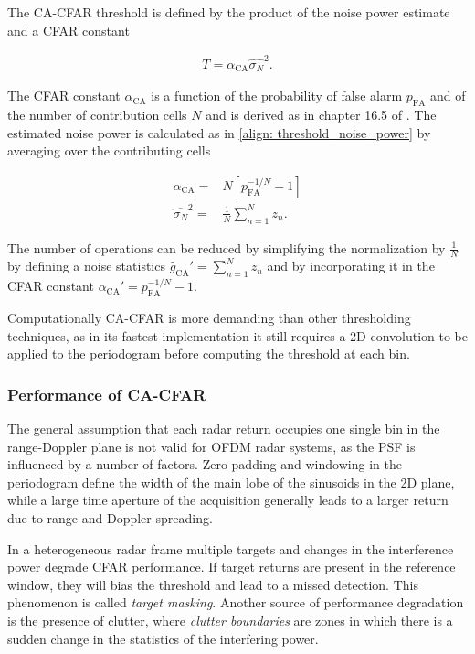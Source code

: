 
The CA-CFAR threshold is defined by the product of the noise power estimate and a CFAR constant

\begin{align*}
	T = \alpha_{\text{CA}} \hat{\sigma_N}^2.
\end{align*}

The CFAR constant $\alpha_{\text{CA}}$ is a function of the probability of false alarm $p_{\text{FA}}$ and of the number of contribution cells $N$ and is derived as in chapter 16.5 of \cite{Richards_Scheer_Holm_2010}. The estimated noise power is calculated as in \ref{align: threshold_noise_power} by averaging over the contributing cells

\begin{align*}
	\alpha_{\text{CA}} =& N[p_{\text{FA}}^{-1/N} - 1] \\
	\hat{\sigma_N}^2 =& \frac{1}{N}\sum_{n=1}^N z_n.
\end{align*}

The number of operations can be reduced by simplifying the normalization by $\frac{1}{N}$ by defining a noise statistics $\hat{g}_{\text{CA}}' = \sum_{n=1}^N z_n$ and by incorporating it in the CFAR constant $\alpha_{\text{CA}}' = p_{\text{FA}}^{-1/N} - 1$.

Computationally CA-CFAR is more demanding than other thresholding techniques, as in its fastest implementation it still requires a 2D convolution to be applied to the periodogram before computing the threshold at each bin.

\subsubsection{Performance of CA-CFAR}

The general assumption that each radar return occupies one single bin in the range-Doppler plane is not valid for OFDM radar systems, as the PSF is influenced by a number of factors.
Zero padding and windowing in the periodogram define the width of the main lobe of the sinusoids in the 2D plane, while a large time aperture of the acquisition generally leads to a larger return due to range and Doppler spreading.

In a heterogeneous radar frame multiple targets and changes in the interference power degrade CFAR performance. If target returns are present in the reference window, they will bias the threshold and lead to a missed detection. This phenomenon is called \textit{target masking}. Another source of performance degradation is the presence of clutter, where \textit{clutter boundaries} are zones in which there is a sudden change in the statistics of the interfering power.

